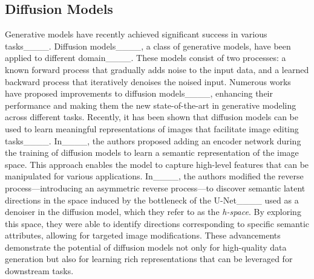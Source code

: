 \subsection{Diffusion Models} Generative models have recently achieved significant success in various tasks____. Diffusion models____, a class of generative models, have been applied to different domain____. These models consist of two processes: a known forward process that gradually adds noise to the input data, and a learned backward process that iteratively denoises the noised input. Numerous works have proposed improvements to diffusion models____, enhancing their performance and making them the new state-of-the-art in generative modeling across different tasks. Recently, it has been shown that diffusion models can be used to learn meaningful representations of images that facilitate image editing tasks____. In____, the authors proposed adding an encoder network during the training of diffusion models to learn a semantic representation of the image space. This approach enables the model to capture high-level features that can be manipulated for various applications. In____, the authors modified the reverse process—introducing an asymmetric reverse process—to discover semantic latent directions in the space induced by the bottleneck of the U-Net____ used as a denoiser in the diffusion model, which they refer to as the \textit{h-space}. By exploring this space, they were able to identify directions corresponding to specific semantic attributes, allowing for targeted image modifications. These advancements demonstrate the potential of diffusion models not only for high-quality data generation but also for learning rich representations that can be leveraged for downstream tasks.
